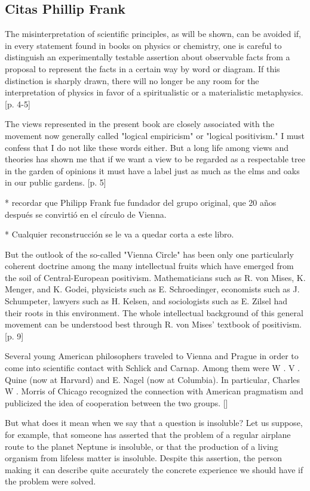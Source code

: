 \subsection{Citas Phillip Frank}

The misinterpretation of scientific principles, as will be shown, can be avoided if, in every statement found in books on physics or chemistry, one is careful to distinguish an experimentally testable assertion  about observable facts from a proposal to represent the facts in a certain way by word or diagram.
If this distinction is sharply drawn, there will no longer be any room for the interpretation of physics in favor of a spiritualistic or a materialistic metaphysics. [p. 4-5]

The views represented in the present book are closely associated with the movement now generally  called "logical empiricism" or "logical positivism."
I must confess that I do not like these words either.
But a long life among views and theories has shown me that if we want a view to be regarded as a respectable tree in the garden of opinions it must have a label just as much as the elms and oaks in our public gardens. [p. 5]

* recordar que Philipp Frank fue fundador del grupo original, que 20 años después se convirtió en el círculo de Vienna.

* Cualquier reconstrucción se le va a quedar corta a este libro.

But the outlook of the so-called "Vienna Circle"  has been only one particularly coherent doctrine  among the many intellectual fruits which have  emerged from the soil of Central-European positivism. Mathematicians such as R. von Mises, Κ. Menger, and Κ. Godei, physicists such as E. Schroedinger,  economists such as J. Schumpeter, lawyers such as  H. Kelsen, and sociologists such as E. Zilsel had their  roots in this environment. The whole intellectual  background of this general movement can be understood best through R. von Mises' textbook of positivism. [p. 9]

Several young American philosophers  traveled to Vienna and Prague in order to come into  scientific contact with Schlick and Carnap. Among  them were W . V . Quine (now at Harvard) and  E. Nagel (now at Columbia). In particular, Charles  W . Morris of Chicago recognized the connection  with American pragmatism and publicized the idea  of cooperation between the two groups. []

But what does it mean when we say that a question  is insoluble? Let us suppose, for example, that someone has asserted that the problem of a regular airplane  route to the planet Neptune is insoluble, or that the  production of a living organism from lifeless matter  is insoluble. 
Despite this assertion, the person making  it can describe quite accurately the concrete experience we should have if the problem were solved.

